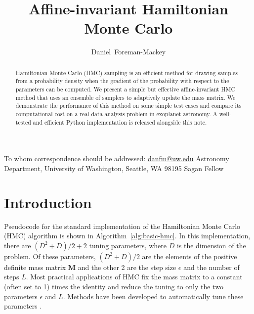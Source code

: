 \documentclass[12pt,preprint]{aastex}
\newcommand{\Alg}[1]{Algorithm~\ref{alg:#1}}
\newcommand{\alg}[1]{\Alg{#1}}
\newcommand{\bvec}[1]{{\ensuremath{\boldsymbol{#1}}}}
\begin{document}
\title{%
    Affine-invariant Hamiltonian Monte Carlo
}

\newcommand{\uw}{2}
\newcommand{\sagan}{3}
\author{%
    Daniel~Foreman-Mackey\altaffilmark{1,\uw,\sagan}
}
         {To whom correspondence should be addressed:
                          \url{danfm@uw.edu}}
\altaffiltext{\uw}       {Astronomy Department, University of Washington,
                          Seattle, WA 98195}
\altaffiltext{\sagan}    {Sagan Fellow}


\begin{abstract}

Hamiltonian Monte Carlo (HMC) sampling is an efficient method for drawing
samples from a probability density when the gradient of the probability with
respect to the parameters can be computed.
We present a simple but effective affine-invariant HMC method that uses an
ensemble of samplers to adaptively update the mass matrix.
We demonstrate the performance of this method on some simple test cases and
compare its computational cost on a real data analysis problem in exoplanet
astronomy.
A well-tested and efficient Python implementation is released alongside this
note.

\end{abstract}


\section{Introduction}


Pseudocode for the standard implementation of the Hamiltonian Monte Carlo
(HMC) algorithm \citep{Neal:2011} is shown in \alg{basic-hmc}.
In this implementation, there are $(D^2 + D) / 2 + 2$ tuning parameters, where
$D$ is the dimension of the problem.
Of these parameters, $(D^2 + D) / 2$ are the elements of the positive
definite mass matrix \bvec{M} and the other 2 are the step size $\epsilon$ and
the number of steps $L$.
Most practical applications of HMC fix the mass matrix to a constant (often
set to 1) times the identity and reduce the tuning to only the two parameters
$\epsilon$ and $L$.
Methods have been developed to automatically tune these parameters \citep[for
example][]{Hoffman:2014}.
\end{document}
